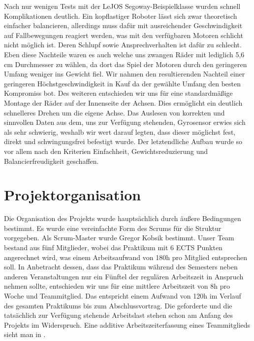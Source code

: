 \documentclass[oneside,abstractoff,a4paper]{scrartcl}
\begin{document}
Nach nur wenigen Tests mit der LeJOS Segoway-Beispielklasse wurden schnell Komplikationen deutlich. Ein kopflastiger Roboter lässt sich zwar theoretisch einfacher balancieren, allerdings muss dafür mit ausreichender Geschwindigkeit auf Fallbewegungen reagiert werden, was mit den verfügbaren Motoren schlicht nicht möglich ist. Deren Schlupf sowie Ansprechverhalten ist dafür zu schlecht. Eben diese Nachteile waren es auch welche uns zwangen Räder mit lediglich 5,6 cm Durchmesser zu wählen, da dort das Spiel der Motoren durch den geringeren Umfang weniger ins Gewicht fiel. Wir nahmen den resultierenden Nachteil einer geringeren Höchstgeschwindigkeit in Kauf da der gewählte Umfang den besten Kompromiss bot. Des weiteren entschieden wir uns für eine standardmäßige Montage der Räder auf der Innenseite der Achsen. Dies ermöglicht ein deutlich schnelleres Drehen um die eigene Achse. Das Auslesen von korrekten und sinnvollen Daten aus dem, uns zur Verfügung stehenden, Gyrosensor erwies sich als sehr schwierig, weshalb wir wert darauf legten, dass dieser möglichst fest, direkt und schwingungsfrei befestigt wurde.
Der letztendliche Aufbau wurde so vor allem nach den Kriterien Einfachheit, Gewichtsreduzierung und Balancierfreudigkeit geschaffen.

\section{Projektorganisation}

Die Organisation des Projekts wurde hauptsächlich durch äußere Bedingungen bestimmt. Es wurde eine vereinfachte Form des Scrums für die Struktur vorgegeben. Als Scrum-Master wurde Gregor Kobsik bestimmt. Unser Team bestand aus fünf Mitglieder, wobei das Praktikum mit 6 ECTS Punkten angerechnet wird, was einem Arbeitsaufwand von 180h pro Mitglied entsprechen soll. In Anbetracht dessen, dass das Praktikum während des Semesters neben anderen Veranstaltungen nur ein Fünftel der regulären Arbeitszeit in Anspruch nehmen sollte, entschieden wir uns für eine mittlere Arbeitszeit von 8h pro Woche und Teammitglied. Das entspricht einem Aufwand von 120h im Verlauf des gesamten Praktikums bis zum Abschlussvortrag. Die geforderte und die tatsächlich zur Verfügung stehende Arbeitslast stehen schon am Anfang des Projekts im Widerspruch. Eine additive Arbeitszeiterfassung eines Teammitglieds sieht man in .
\end{document}
